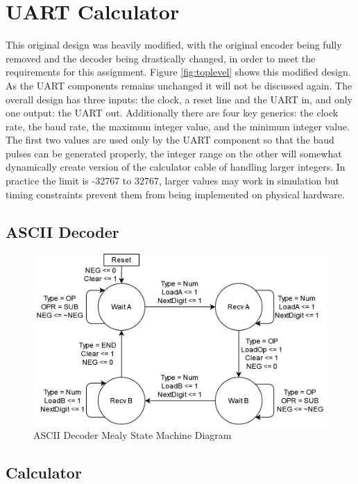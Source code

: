 \documentclass[11pt]{article}
\begin{document}
\section{UART Calculator}
This original design was heavily modified, with the original encoder being fully removed and the decoder being drastically changed, in order to meet the requirements for this assignment.
Figure \ref{fig:toplevel} shows this modified design.
As the UART components remains unchanged it will not be discussed again.
The overall design has three inputs: the clock, a reset line and the UART in, and only one output: the UART out.
Additionally there are four key generics: the clock rate, the baud rate, the maximum integer value, and the minimum integer value.
The first two values are used only by the UART component so that the baud pulses can be generated properly,
the integer range on the other will somewhat dynamically create version of the calculator cable of handling larger integers.
In practice the limit is -32767 to 32767, larger values may work in simulation but timing constraints prevent them from being implemented on physical hardware.


\subsection{ASCII Decoder}

\begin{figure}[H]        
    \centering
    \includegraphics[width=.66\textwidth]{DecoderSM.drawio.png}
    \caption{ASCII Decoder Mealy State Machine Diagram}
    \label{fig:decodersm}
\end{figure} 


\subsection{Calculator}
\end{document}
